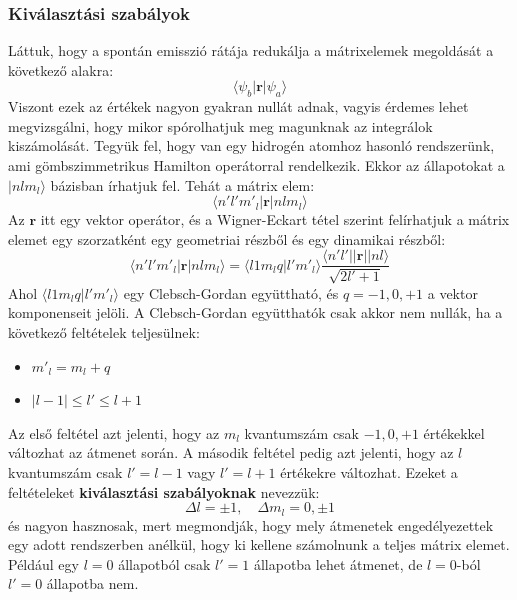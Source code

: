\documentclass[../main.tex]{subfiles}
\begin{document}
\subsubsection{Kiválasztási szabályok}
Láttuk, hogy a spontán emisszió rátája redukálja a mátrixelemek megoldását a következő alakra:
\begin{equation}
    \langle \psi_b | \mathbf{r} | \psi_a \rangle
\end{equation}
Viszont ezek az értékek nagyon gyakran nullát adnak, vagyis érdemes lehet megvizsgálni, hogy mikor spórolhatjuk meg magunknak az integrálok kiszámolását.
Tegyük fel, hogy van egy hidrogén atomhoz hasonló rendszerünk, ami gömbszimmetrikus Hamilton operátorral rendelkezik. Ekkor az állapotokat a $|n l m_l \rangle$ bázisban írhatjuk fel. Tehát a mátrix elem:
\begin{equation}
    \langle n' l' m'_l | \mathbf{r} | n l m_l \rangle
\end{equation}
Az $\mathbf{r}$ itt egy vektor operátor, és a Wigner-Eckart tétel szerint felírhatjuk a mátrix elemet egy szorzatként egy geometriai részből és egy dinamikai részből:
\begin{equation}
    \langle n' l' m'_l | \mathbf{r} | n l m_l \rangle = \langle l 1 m_l q | l' m'_l \rangle \frac{\langle n' l' || \mathbf{r} || n l \rangle}{\sqrt{2l' + 1}}
\end{equation}
Ahol $\langle l 1 m_l q | l' m'_l \rangle$ egy Clebsch-Gordan együttható, és $q = -1, 0, +1$ a vektor komponenseit jelöli. A Clebsch-Gordan együtthatók csak akkor nem nullák, ha a következő feltételek teljesülnek:
\begin{itemize}
    \item $m'_l = m_l + q$
    \item $|l - 1| \leq l' \leq l + 1$
\end{itemize}
Az első feltétel azt jelenti, hogy az $m_l$ kvantumszám csak $-1, 0, +1$ értékekkel változhat az átmenet során. A második feltétel pedig azt jelenti, hogy az $l$ kvantumszám csak $l' = l - 1$ vagy $l' = l + 1$ értékekre változhat.
Ezeket a feltételeket \textbf{kiválasztási szabályoknak} nevezzük:
\begin{equation}
    \boxed{\Delta l = \pm 1, \quad \Delta m_l = 0, \pm 1}
\end{equation}
és nagyon hasznosak, mert megmondják, hogy mely átmenetek engedélyezettek egy adott rendszerben anélkül, hogy ki kellene számolnunk a teljes
mátrix elemet. Például egy $l=0$ állapotból csak $l'=1$ állapotba lehet átmenet, de $l=0$-ból $l'=0$ állapotba nem.
\end{document}
